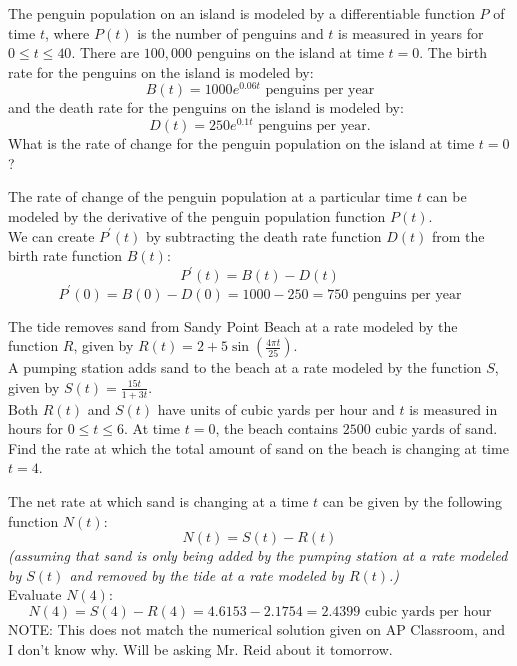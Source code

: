 \documentclass[12pt,letterpaper, onecolumn]{exam}
\begin{document}
\begin{questions}
\pagebreak

\question
The penguin population on an island is modeled by a differentiable function $P$ of time $t$, where $P(t)$ is the number of penguins and $t$ is measured in years for $0 \leq t \leq 40$. There are $100,000$ penguins on the island at time $t = 0$. The birth rate for the penguins on the island is modeled by:
$$B(t) = 1000e^{0.06t} \text{ penguins per year}$$ 
and the death rate for the penguins on the island is modeled by:
$$D(t)=250e^{0.1t} \text{ penguins per year.}$$
What is the rate of change for the penguin population on the island at time $t = 0$?
\begin{solution}
	The rate of change of the penguin population at a particular time $t$ can be modeled by the derivative of the penguin population function $P(t)$. \\
	We can create $P^\prime(t)$ by subtracting the death rate function $D(t)$ from the birth rate function $B(t)$:
	$$P^\prime(t)=B(t)-D(t)$$
	$$P^\prime(0)=B(0)-D(0) = 1000-250 = \boxed{750 \text{ penguins per year}}$$
\end{solution}


\pagebreak

\question
The tide removes sand from Sandy Point Beach at a rate modeled by the function $R$, given by $R(t)=2+5\sin(\frac{4\pi t}{25})$. \\
A pumping station adds sand to the beach at a rate modeled by the function $S$, given by $S(t)=\frac{15t}{1+3t}$. \\
Both $R(t)$ and $S(t)$ have units of cubic yards per hour and $t$ is measured in hours for $0 \leq t \leq 6$. At time $t = 0$, the beach contains $2500$ cubic yards of sand. \\
Find the rate at which the total amount of sand on the beach is changing at time $t = 4$.

\begin{solution}
	The net rate at which sand is changing at a time $t$ can be given by the following function $N(t)$:
	$$N(t)=S(t)-R(t)$$
	\emph{(assuming that sand is only being added by the pumping station at a rate modeled by $S(t)$ and removed by the tide at a rate modeled by $R(t)$.)} \\
	Evaluate $N(4)$:
	$$N(4)=S(4)-R(4)=4.6153-2.1754=\boxed{2.4399 \text{ cubic yards per hour}}$$
	{\color{red} NOTE: This does not match the numerical solution given on AP Classroom, and I don't know why. Will be asking Mr. Reid about it tomorrow.}
\end{solution}


\end{questions}
\end{document}
